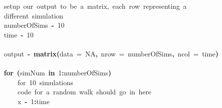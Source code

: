 \documentclass{article}\usepackage{graphicx, color}
\makeatletter
\newcommand{\hlnumber}[1]{\textcolor[rgb]{0,0,0}{#1}}%
\newcommand{\hlfunctioncall}[1]{\textcolor[rgb]{0.501960784313725,0,0.329411764705882}{\textbf{#1}}}%
\newcommand{\hlkeyword}[1]{\textcolor[rgb]{0,0,0}{\textbf{#1}}}%
\newcommand{\hlargument}[1]{\textcolor[rgb]{0.690196078431373,0.250980392156863,0.0196078431372549}{#1}}%
\newcommand{\hlcomment}[1]{\textcolor[rgb]{0.180392156862745,0.6,0.341176470588235}{#1}}%
\newcommand{\hlassignement}[1]{\textcolor[rgb]{0,0,0}{\textbf{#1}}}%
\newcommand{\hlsymbol}[1]{\textcolor[rgb]{0,0,0}{#1}}%
\newcommand{\hlstd}[1]{\textcolor[rgb]{0,0,0}{#1}}%
\newenvironment{kframe}{%
 \def\FrameCommand##1{\hskip\@totalleftmargin \hskip-\fboxsep
 \colorbox{shadecolor}{##1}\hskip-\fboxsep
     \hskip-\linewidth \hskip-\@totalleftmargin \hskip\columnwidth}%
 \MakeFramed {\advance\hsize-\width
   \@totalleftmargin\z@ \linewidth\hsize
   \@setminipage}}%
 {\par\unskip\endMakeFramed}
\newenvironment{knitrout}{}{} %
\makeatother
\begin{document}
\begin{knitrout}
\color{fgcolor}\begin{kframe}
\begin{flushleft}
\ttfamily\noindent
\hlcomment{\usebox{\hlnormalsizeboxhash}{\ }setup{\ }our{\ }output{\ }to{\ }be{\ }a{\ }matrix,{\ }each{\ }row{\ }representing{\ }a}\hspace*{\fill}\\
\hlstd{}\hlcomment{\usebox{\hlnormalsizeboxhash}{\ }different{\ }simulation}\hspace*{\fill}\\
\hlstd{}\hlsymbol{numberOfSims}{\ }\hlassignement{\usebox{\hlnormalsizeboxlessthan}-}{\ }\hlnumber{10}\hspace*{\fill}\\
\hlstd{}\hlsymbol{time}{\ }\hlassignement{\usebox{\hlnormalsizeboxlessthan}-}{\ }\hlnumber{10}\hspace*{\fill}\\
\hlstd{}\hspace*{\fill}\\
\hlstd{}\hlsymbol{output}{\ }\hlassignement{\usebox{\hlnormalsizeboxlessthan}-}{\ }\hlfunctioncall{matrix}\hlkeyword{(}\hlargument{data}{\ }\hlargument{=}{\ }\hlnumber{NA}\hlkeyword{,}{\ }\hlargument{nrow}{\ }\hlargument{=}{\ }\hlsymbol{numberOfSims}\hlkeyword{,}{\ }\hlargument{ncol}{\ }\hlargument{=}{\ }\hlsymbol{time}\hlkeyword{)}\hspace*{\fill}\\
\hlstd{}\hspace*{\fill}\\
\hlstd{}\hlkeyword{for}{\ }\hlkeyword{(}\hlsymbol{simNum}{\ }\hlkeyword{in}{\ }\hlnumber{1}\hlkeyword{:}\hlsymbol{numberOfSims}\hlkeyword{)}{\ }\hlkeyword{\usebox{\hlnormalsizeboxopenbrace}}\hspace*{\fill}\\
\hlstd{}{\ }{\ }{\ }{\ }\hlcomment{\usebox{\hlnormalsizeboxhash}for{\ }10{\ }simulations}\hspace*{\fill}\\
\hlstd{}{\ }{\ }{\ }{\ }\hlcomment{\usebox{\hlnormalsizeboxhash}{\ }code{\ }for{\ }a{\ }random{\ }walk{\ }should{\ }go{\ }in{\ }here}\hspace*{\fill}\\
\hlstd{}{\ }{\ }{\ }{\ }\hlsymbol{x}{\ }\hlassignement{\usebox{\hlnormalsizeboxlessthan}-}{\ }\hlnumber{1}\hlkeyword{:}\hlsymbol{time}\hspace*{\fill}\\

\end{flushleft}
\end{kframe}
\end{knitrout}
\end{document}

